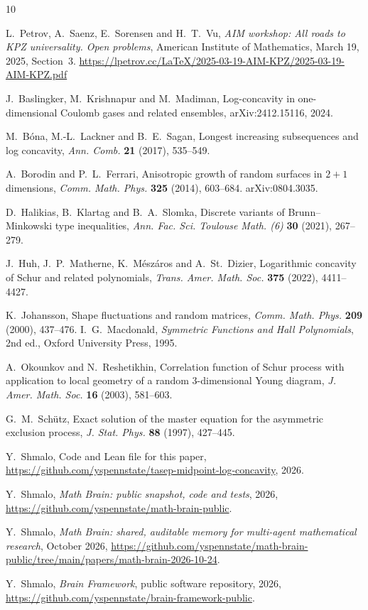\documentclass[11pt]{amsart}
\theoremstyle{remark}
\numberwithin{equation}{section}
\newcommand{\1}{\mathbf 1}
\begin{document}
\begin{thebibliography}{10}

L.~Petrov, A.~Saenz, E.~Sorensen and H.~T.~Vu, \emph{AIM workshop: All roads to KPZ universality. Open problems}, American Institute of Mathematics, March 19, 2025, Section~3. \url{https://lpetrov.cc/LaTeX/2025-03-19-AIM-KPZ/2025-03-19-AIM-KPZ.pdf}

J.~Baslingker, M.~Krishnapur and M.~Madiman, Log-concavity in one-dimensional Coulomb gases and related ensembles, arXiv:2412.15116, 2024.

M.~B\'ona, M.-L.~Lackner and B.~E.~Sagan, Longest increasing subsequences and log concavity, \emph{Ann. Comb.} \textbf{21} (2017), 535--549.

A.~Borodin and P.~L.~Ferrari, Anisotropic growth of random surfaces in $2+1$ dimensions, \emph{Comm. Math. Phys.} \textbf{325} (2014), 603--684. arXiv:0804.3035.

D.~Halikias, B.~Klartag and B.~A.~Slomka, Discrete variants of Brunn--Minkowski type inequalities, \emph{Ann. Fac. Sci. Toulouse Math. (6)} \textbf{30} (2021), 267--279.

J.~Huh, J.~P.~Matherne, K.~M\'esz\'aros and A.~St.~Dizier, Logarithmic concavity of Schur and related polynomials, \emph{Trans. Amer. Math. Soc.} \textbf{375} (2022), 4411--4427.

K.~Johansson, Shape fluctuations and random matrices, \emph{Comm. Math. Phys.} \textbf{209} (2000), 437--476.
I.~G.~Macdonald, \emph{Symmetric Functions and Hall Polynomials}, 2nd ed., Oxford University Press, 1995.

A.~Okounkov and N.~Reshetikhin, Correlation function of Schur process with application to local geometry of a random 3-dimensional Young diagram, \emph{J. Amer. Math. Soc.} \textbf{16} (2003), 581--603.

G.~M.~Sch\"utz, Exact solution of the master equation for the asymmetric exclusion process, \emph{J. Stat. Phys.} \textbf{88} (1997), 427--445.

Y.~Shmalo, Code and Lean file for this paper, \url{https://github.com/yspennstate/tasep-midpoint-log-concavity}, 2026.

 Y.~Shmalo, \emph{Math Brain: public snapshot, code and tests}, 2026, \url{https://github.com/yspennstate/math-brain-public}.

 Y.~Shmalo, \emph{Math Brain: shared, auditable memory for multi-agent mathematical research}, October 2026, \url{https://github.com/yspennstate/math-brain-public/tree/main/papers/math-brain-2026-10-24}.

 Y.~Shmalo, \emph{Brain Framework}, public software repository, 2026, \url{https://github.com/yspennstate/brain-framework-public}.

\end{thebibliography}
\end{document}

